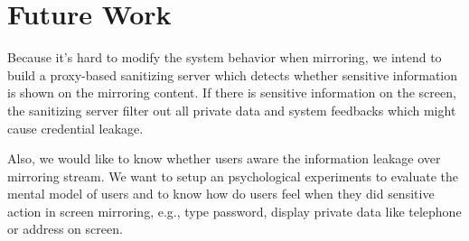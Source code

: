 \chapter{Future Work}

Because it's hard to modify the system behavior when mirroring, we intend to build a proxy-based sanitizing server which detects whether sensitive information is shown on the mirroring content. If there is sensitive information on the screen, the sanitizing server filter out all private data and system feedbacks which might cause credential leakage.

Also, we would like to know whether users aware the information leakage over mirroring stream. We want to setup an  psychological experiments to evaluate the mental model of users and to know how do users feel when they did sensitive action in screen mirroring, e.g., type password, display private data like telephone or address on screen.
